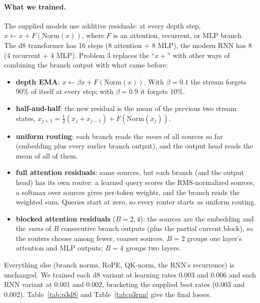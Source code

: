 \paragraph{What we trained.} The supplied models use additive residuals: at every depth step, $x \leftarrow x + F(\mathrm{Norm}(x))$, where $F$ is an attention, recurrent, or MLP branch. The d8 transformer has 16 steps (8 attention + 8 MLP), the modern RNN has 8 (4 recurrent + 4 MLP). Problem 3 replaces the ``$x +$'' with other ways of combining the branch output with what came before:
\begin{itemize}
\item \textbf{depth EMA}: $x \leftarrow \beta x + F(\mathrm{Norm}(x))$. With $\beta=0.1$ the stream forgets 90\% of itself at every step; with $\beta=0.9$ it forgets 10\%.
\item \textbf{half-and-half}: the new residual is the mean of the previous two stream states, $x_{j+1} = \tfrac12(x_j + x_{j-1}) + F(\mathrm{Norm}(x_j))$.
\item \textbf{uniform routing}: each branch reads the \emph{mean} of all sources so far (embedding plus every earlier branch output), and the output head reads the mean of all of them.
\item \textbf{full attention residuals}: same sources, but each branch (and the output head) has its own router: a learned query scores the RMS-normalized sources, a softmax over sources gives per-token weights, and the branch reads the weighted sum. Queries start at zero, so every router starts as uniform routing.
\item \textbf{blocked attention residuals} ($B=2,4$): the sources are the embedding and the \emph{sums} of $B$ consecutive branch outputs (plus the partial current block), so the routers choose among fewer, coarser sources. $B=2$ groups one layer's attention and MLP outputs; $B=4$ groups two layers.
\end{itemize}
Everything else (branch norms, RoPE, QK-norm, the RNN's recurrence) is unchanged. We trained each d8 variant at learning rates 0.003 and 0.006 and each RNN variant at 0.001 and 0.002, bracketing the supplied best rates (0.003 and 0.002). Table~\ref{tab:p3d8} and Table~\ref{tab:p3rnn} give the final losses.



